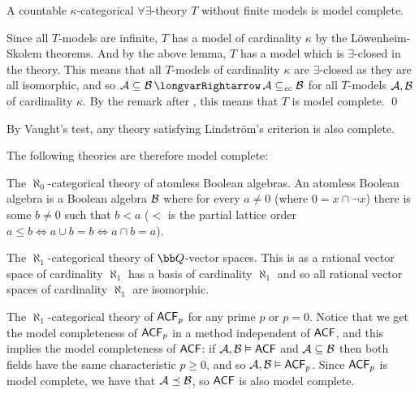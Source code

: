\bthrm[title=Lindstr\"om's Criterion, name=lindstromcriterion]

    A countable $\kappa$-categorical $\forall\exists$-theory $T$ without finite models is model complete.

\ethrm

Since all $T$-models are infinite, $T$ has a model of cardinality $\kappa$ by the L\"owenheim-Skolem theorems.
And by the above lemma, $T$ has a model which is $\exists$-closed in the theory.
This means that all $T$-models of cardinality $\kappa$ are $\exists$-closed as they are all isomorphic, and so ${\cal A}\subseteq{\cal B}\implies{\cal A}\subseteq_{\it ec}{\cal B}$ for all $T$-models
${\cal A},{\cal B}$ of cardinality $\kappa$.
By the remark after , this means that $T$ is model complete.
\qed

By Vaught's test, any theory satisfying Lindstr\"om's criterion is also complete.

\bexam

    The following theories are therefore model complete:
    \benum
        \item The $\aleph_0$-categorical theory of atomless Boolean algebras.
        An atomless Boolean algebra is a Boolean algebra ${\cal B}$ where for every $a\neq0$ (where $0=x\cap\neg x$) there is some $b\neq0$ such that $b<a$ ($<$ is the partial lattice order
        $a\leq b\iff a\cup b=b\iff a\cap b=a$).
        \item The $\aleph_1$-categorical theory of ${\bb Q}$-vector spaces.
        This is as a rational vector space of cardinality $\aleph_1$ has a basis of cardinality $\aleph_1$ and so all rational vector spaces of cardinality $\aleph_1$ are isomorphic.
        \item The $\aleph_1$-categorical theory of ${\sf ACF}_p$ for any prime $p$ or $p=0$.
        Notice that we get the model completeness of ${\sf ACF}_p$ in a method independent of ${\sf ACF}$, and this implies the model completeness of ${\sf ACF}$: if ${\cal A},{\cal B}\vDash{\sf ACF}$
        and ${\cal A}\subseteq{\cal B}$ then both fields have the same characteristic $p\geq0$, and so ${\cal A},{\cal B}\vDash{\sf ACF}_p$.
        Since ${\sf ACF}_p$ is model complete, we have that ${\cal A}\preceq{\cal B}$, so ${\sf ACF}$ is also model complete.
    \eenum

\eexam

